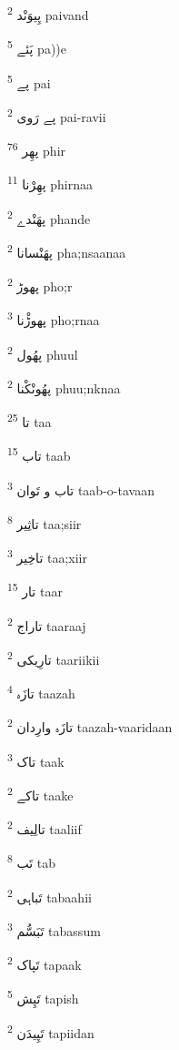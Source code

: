 \documentclass[12pt]{article}
\begin{document}
\begin{RTL}
\begin{multicols}{5}
{\ur پِیوَنْد}   \textsuperscript{2} paivand

{\ur پَئے}   \textsuperscript{5} pa))e

{\ur پے}   \textsuperscript{5} pai

{\ur پے رَوی}   \textsuperscript{2} pai-ravii

{\ur پھِر}   \textsuperscript{76} phir

{\ur پھِرْنا}   \textsuperscript{11} phirnaa

{\ur پھَنْدے}   \textsuperscript{2} phande

{\ur پھَنْسانا}   \textsuperscript{2} pha;nsaanaa

{\ur پھوڑ}   \textsuperscript{2} pho;r

{\ur پھوڑْنا}   \textsuperscript{3} pho;rnaa

{\ur پھُول}   \textsuperscript{2} phuul

{\ur پھُونْکْنا}   \textsuperscript{2} phuu;nknaa

{\ur تا}   \textsuperscript{25} taa

{\ur تاب}   \textsuperscript{15} taab

{\ur تاب و تَوان}   \textsuperscript{3} taab-o-tavaan

{\ur تاثِیر}   \textsuperscript{8} taa;siir

{\ur تاخِیر}   \textsuperscript{3} taa;xiir

{\ur تار}   \textsuperscript{15} taar

{\ur تاراج}   \textsuperscript{2} taaraaj

{\ur تارِیکی}   \textsuperscript{2} taariikii

{\ur تازَہ}   \textsuperscript{4} taazah

{\ur تازَہ وارِدان}   \textsuperscript{2} taazah-vaaridaan

{\ur تاک}   \textsuperscript{3} taak

{\ur تاکے}   \textsuperscript{2} taake

{\ur تالِیف}   \textsuperscript{2} taaliif

{\ur تَب}   \textsuperscript{8} tab

{\ur تَباہی}   \textsuperscript{2} tabaahii

{\ur تَبَسُّم}   \textsuperscript{3} tabassum

{\ur تَپاک}   \textsuperscript{2} tapaak

{\ur تَپِش}   \textsuperscript{5} tapish

{\ur تَپِیدَن}   \textsuperscript{2} tapiidan


\end{multicols}
\end{RTL}
\end{document}
